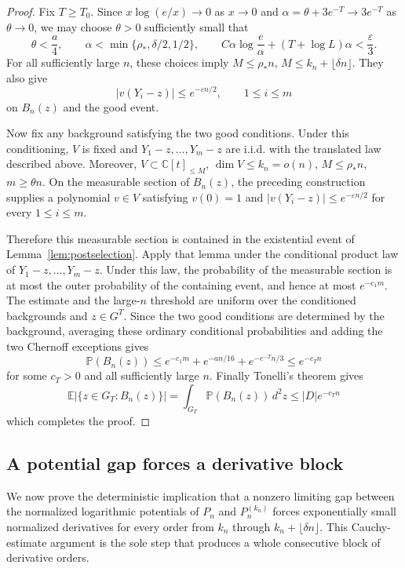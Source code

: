 \documentclass[10pt,reqno]{amsart}
\theoremstyle{remark}
\newcommand{\C}{\mathbb C}
\newcommand{\E}{\mathbb E}
\newcommand{\Prob}{\mathbb P}
\begin{document}
\begin{proof}
    Fix $T\ge T_0$. Since $x\log(e/x)\to 0$ as $x\to 0$ and $\alpha=\theta+3e^{-T}\to3e^{-T}$ as $\theta\to 0$, we may choose $\theta>0$ sufficiently small that
    \[\theta<\frac a4,
    \qquad
    \alpha<\min\{\rho_*,\delta/2,1/2\},
    \qquad
    C\alpha\log\frac e\alpha+(T+\log L)\alpha<\frac{\varepsilon}{3}.\]
    For all sufficiently large $n$, these choices imply $M\le\rho_*n$, $M\le k_n+\lfloor\delta n\rfloor$. They also give
    \[|v(Y_i-z)|\le e^{-\varepsilon n/2}, \qquad 1\le i\le m\] on $B_n(z)$ and the good event.
    
    Now fix any background satisfying the two good conditions. Under this conditioning, $V$ is fixed and $Y_1-z,\ldots,Y_m-z$ are i.i.d. with the translated law described above. Moreover, $V\subset\C[t]_{\le M}$, $\dim V\le k_n=o(n)$, $M\le\rho_*n$, $m\ge\theta n$. On the measurable section of $B_n(z)$, the preceding construction supplies a polynomial $v\in V$ satisfying $v(0)=1$ and $|v(Y_i-z)|\le e^{-\varepsilon n/2}$ for every $1\le i\le m$. 

    Therefore this measurable section is contained in the existential event of Lemma~\ref{lem:postselection}. Apply that lemma under the conditional product law of $Y_1-z,\ldots,Y_m-z$. Under this law, the probability of the measurable section is at most the outer probability of the containing event, and hence at most $e^{-c_1m}$. The estimate and the large-$n$ threshold are uniform over the conditioned backgrounds and $z\in G^T$. Since the two good conditions are determined by the background, averaging these ordinary conditional probabilities and adding the two Chernoff exceptions gives
    \[\Prob(B_n(z))
    \le e^{-c_1m}+e^{-an/16}+e^{-e^{-T}n/3}
    \le e^{-c_Tn}\]
    for some $c_T>0$ and all sufficiently large $n$. Finally Tonelli's theorem gives
    \[\E\bigl|\{z\in G_T:B_n(z)\}\bigr|=\int_{G_T}\Prob(B_n(z))\,d^2z \le|D|e^{-c_Tn}\]
    which completes the proof.
\end{proof}

\subsection{A potential gap forces a derivative block}
We now prove the deterministic implication that a nonzero limiting gap between the normalized logarithmic potentials of $P_n$ and $P^{(k_n)}_n$ forces exponentially small normalized derivatives for every order from $k_n$ through $k_n+\lfloor \delta n\rfloor$. This Cauchy-estimate argument is the sole step that produces a whole consecutive block of derivative orders.
\end{document}
